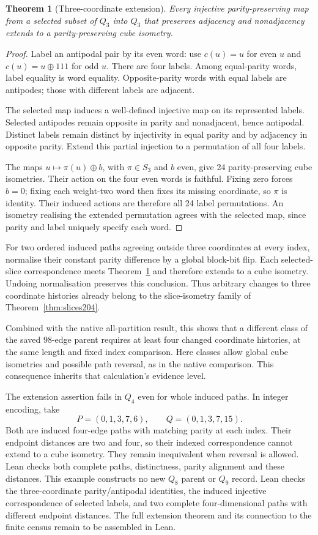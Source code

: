 \documentclass[11pt,a4paper]{article}
\newtheorem{theorem}{Theorem}[section]
\theoremstyle{definition}
\theoremstyle{remark}
\begin{document}
\begin{theorem}[Three-coordinate extension]
\label{thm:extension205}
Every injective parity-preserving map from a selected subset of
$Q_3$ into $Q_3$ that preserves adjacency and nonadjacency extends
to a parity-preserving cube isometry.
\end{theorem}
\begin{proof}
Label an antipodal pair by its even word: use $c(u)=u$ for even
$u$ and $c(u)=u\oplus111$ for odd $u$. There are four labels.
Among equal-parity words, label equality is word equality.
Opposite-parity words with equal labels are antipodes; those with
different labels are adjacent.

The selected map induces a well-defined injective map on its
represented labels. Selected antipodes remain opposite in parity
and nonadjacent, hence antipodal. Distinct labels remain distinct
by injectivity in equal parity and by adjacency in opposite
parity. Extend this partial injection to a permutation of all
four labels.

The maps $u\mapsto\pi(u)\oplus b$, with $\pi\in S_3$ and $b$
even, give 24 parity-preserving cube isometries. Their action on
the four even words is faithful. Fixing zero forces $b=0$;
fixing each weight-two word then fixes its missing coordinate,
so $\pi$ is identity. Their induced actions are therefore all
24 label permutations. An isometry realising the extended
permutation agrees with the selected map, since parity and label
uniquely specify each word.
\end{proof}

For two ordered induced paths agreeing outside three coordinates
at every index, normalise their constant parity difference by a
global block-bit flip. Each selected-slice correspondence meets
Theorem~\ref{thm:extension205} and therefore extends to a cube
isometry. Undoing normalisation preserves this conclusion.
Thus arbitrary changes to three coordinate histories already
belong to the slice-isometry family of Theorem~\ref{thm:slices204}.

Combined with the native all-partition result, this shows that a
different class of the saved 98-edge parent requires at least four
changed coordinate histories, at the same length and fixed index
comparison. Here classes allow global cube isometries and possible
path reversal, as in the native comparison. This consequence
inherits that calculation's evidence level.

The extension assertion fails in $Q_4$ even for whole induced
paths. In integer encoding, take
\[
P=(0,1,3,7,6),\qquad Q=(0,1,3,7,15).
\]
Both are induced four-edge paths with matching parity at each
index. Their endpoint distances are two and four, so their
indexed correspondence cannot extend to a cube isometry. They
remain inequivalent when reversal is allowed. Lean checks both
complete paths, distinctness, parity alignment and these distances.
This example constructs no new $Q_8$ parent or $Q_9$ record.
Lean checks the three-coordinate parity/antipodal identities, the induced injective correspondence of selected labels, and two complete four-dimensional paths with different endpoint distances. The full extension theorem and its connection
to the finite census remain to be assembled in Lean.
\end{document}
